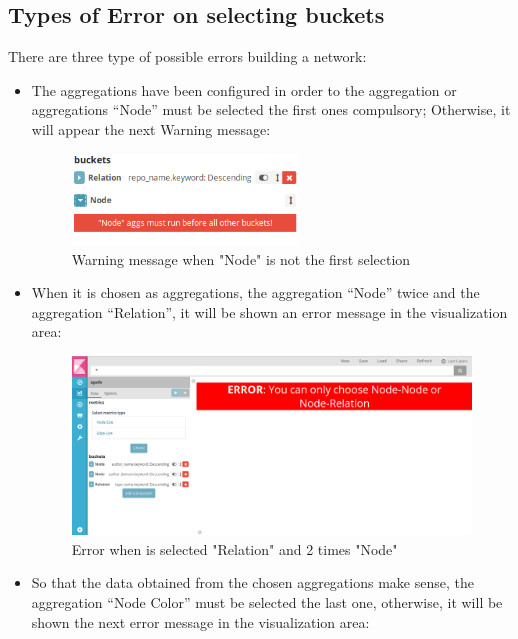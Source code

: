 \documentclass[a4paper, 12pt]{book}
\begin{document}
\subsection{Types of Error on selecting buckets}

There are three type of possible errors building a network:

\begin{itemize}
\item The aggregations have been configured in order to the aggregation or aggregations “Node” must be selected the first ones compulsory; Otherwise, it will appear the next Warning message: 
 
\begin{figure}[H]
  \centering
  \includegraphics[width=6cm, keepaspectratio]{img/results/nodefirsterror}
  \caption{Warning message when "Node" is not the first selection}
  \label{fig:noderror}
\end{figure}

\item When it is chosen as aggregations, the aggregation “Node” twice and the aggregation “Relation”, it will be shown an error message in the visualization area:

\begin{figure}[H]
  \centering
  \includegraphics[width=16cm, keepaspectratio]{img/results/errornodenoderelation}
  \caption{Error when is selected "Relation" and 2 times "Node"}
  \label{fig:errornodenoderelation}
\end{figure}

\item So that the data obtained from the chosen aggregations make sense, the aggregation “Node Color” must be selected the last one, otherwise, it will be shown the next error message in the visualization area:
 

\end{itemize}
\end{document}
